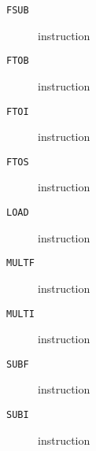 \clearpage
\begin{description}
\item[\texttt{FSUB}] instruction\\

\end{description}
\clearpage
\begin{description}
\item[\texttt{FTOB}] instruction\\

\end{description}
\clearpage
\begin{description}
\item[\texttt{FTOI}] instruction\\

\end{description}
\clearpage
\begin{description}
\item[\texttt{FTOS}] instruction\\

\end{description}
\clearpage
\begin{description}
\item[\texttt{LOAD}] instruction\\

\end{description}
\clearpage
\begin{description}
\item[\texttt{MULTF}] instruction\\

\end{description}
\clearpage
\begin{description}
\item[\texttt{MULTI}] instruction\\

\end{description}
\clearpage
\begin{description}
\item[\texttt{SUBF}] instruction\\

\end{description}
\clearpage
\begin{description}
\item[\texttt{SUBI}] instruction\\

\end{description}
\clearpage
